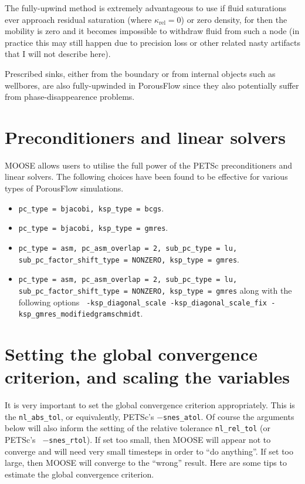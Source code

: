 \documentclass[12pt]{report}
\begin{document}
The fully-upwind method is extremely
advantageous to use if fluid saturations ever approach residual
saturation (where $\kappa_{\mathrm{rel}}=0$) or zero density, for then
the mobility is zero and it becomes impossible to withdraw fluid from
such a node (in practice this may still happen due to precision loss
or other related nasty artifacts that I will not describe here).

Prescribed sinks, either from the boundary or from internal objects
such as wellbores, are also fully-upwinded in PorousFlow since they
also potentially suffer from phase-disappearence problems.

\section{Preconditioners and linear solvers}

MOOSE allows users to utilise the full power of the PETSc
preconditioners and linear solvers.  The following choices have been
found to be effective for various types of PorousFlow simulations.
\begin{itemize}
\item {\tt pc\_type = bjacobi, ksp\_type = bcgs}.
\item {\tt pc\_type = bjacobi, ksp\_type = gmres}.
\item {\tt pc\_type = asm, pc\_asm\_overlap = 2, sub\_pc\_type = lu,
  sub\_pc\_factor\_shift\_type = NONZERO, 
  ksp\_type = gmres}.
\item {\tt pc\_type = asm, pc\_asm\_overlap = 2, sub\_pc\_type = lu,
  sub\_pc\_factor\_shift\_type = NONZERO, 
  ksp\_type = gmres} along with the following options {\tt
  -ksp\_diagonal\_scale -ksp\_diagonal\_scale\_fix
  -ksp\_gmres\_modifiedgramschmidt}.
\end{itemize}

\section{Setting the global convergence criterion, and scaling the variables}

It is very important to set the global convergence criterion
appropriately.  This is the {\tt nl\_abs\_tol}, or equivalently,
PETSc's {\tt $-$snes\_atol}.  Of course the arguments below will also
inform the setting of the relative tolerance {\tt nl\_rel\_tol} (or PETSc's {\tt
  $-$snes\_rtol}).  If set too small, then MOOSE will appear not to
converge and will need very small timesteps in order to ``do
anything''.  If set too large, then MOOSE will converge to the
``wrong'' result.  Here are some tips to estimate the global convergence
criterion.
\end{document}

